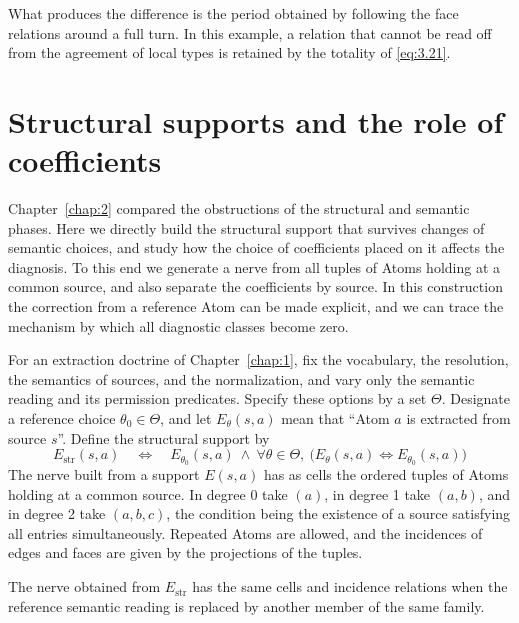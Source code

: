 What produces the difference is the period obtained by following the face relations
around a full turn.
In this example, a relation that cannot be read off from the agreement of local
types is retained by the totality of \eqref{eq:3.21}.

\section{Structural supports and the role of coefficients}\label{sec:3.8}

Chapter~\ref{chap:2} compared the obstructions of the structural and semantic
phases.
Here we directly build the structural support that survives changes of semantic
choices, and study how the choice of coefficients placed on it affects the
diagnosis.
To this end we generate a nerve from all tuples of Atoms holding at a common source,
and also separate the coefficients by source.
In this construction the correction from a reference Atom can be made explicit, and
we can trace the mechanism by which all diagnostic classes become zero.

\begin{definition}\label{def:3.29}

For an extraction doctrine of Chapter~\ref{chap:1}, fix the vocabulary, the
resolution, the semantics of sources, and the normalization, and vary only the
semantic reading and its permission predicates. Specify these options by a set
$\Theta$.
Designate a reference choice $\theta_0\in\Theta$, and let $E_\theta(s,a)$ mean that
``Atom $a$ is extracted from source $s$''.
Define the structural support by
\begin{equation*}
E_{\mathrm{str}}(s,a)
\quad\Longleftrightarrow\quad
E_{\theta_0}(s,a)\ \land\
\forall\theta\in\Theta,\
\bigl(E_\theta(s,a)\Longleftrightarrow E_{\theta_0}(s,a)\bigr)
\tag{3.24}\label{eq:3.24}
\end{equation*}
The nerve built from a support $E(s,a)$ has as cells the ordered tuples of Atoms
holding at a common source.
In degree 0 take $(a)$, in degree 1 take $(a,b)$, and in degree 2 take $(a,b,c)$,
the condition being the existence of a source satisfying all entries simultaneously.
Repeated Atoms are allowed, and the incidences of edges and faces are given by the
projections of the tuples.

\end{definition}

\begin{proposition}\label{prop:3.30}

The nerve obtained from $E_{\mathrm{str}}$ has the same cells and incidence
relations when the reference semantic reading is replaced by another member of the
same family.

\end{proposition}

